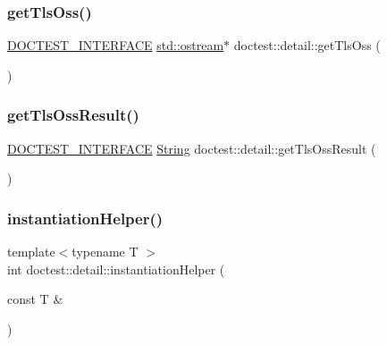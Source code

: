 \mbox{\label{namespacedoctest_1_1detail_a52299f4a981a01a3d3fe6e8d7518823d}} 
\subsubsection{\texorpdfstring{get\+Tls\+Oss()}{getTlsOss()}}
{\footnotesize\ttfamily \hyperlink{doctest_8h_a9c16ffc635ec47f07797d21ede26b1a5}{D\+O\+C\+T\+E\+S\+T\+\_\+\+I\+N\+T\+E\+R\+F\+A\+CE} \hyperlink{doctest_8h_a116af65cb5e924b33ad9d9ecd7a783f3}{std\+::ostream}$\ast$ doctest\+::detail\+::get\+Tls\+Oss (\begin{DoxyParamCaption}{ }\end{DoxyParamCaption})}

\mbox{\label{namespacedoctest_1_1detail_a7b0b3df5fe79d7ffa8fa138201476df1}} 
\subsubsection{\texorpdfstring{get\+Tls\+Oss\+Result()}{getTlsOssResult()}}
{\footnotesize\ttfamily \hyperlink{doctest_8h_a9c16ffc635ec47f07797d21ede26b1a5}{D\+O\+C\+T\+E\+S\+T\+\_\+\+I\+N\+T\+E\+R\+F\+A\+CE} \hyperlink{classdoctest_1_1_string}{String} doctest\+::detail\+::get\+Tls\+Oss\+Result (\begin{DoxyParamCaption}{ }\end{DoxyParamCaption})}

\mbox{\label{namespacedoctest_1_1detail_aad401b097a9af4df1d4a9d0911957c0f}} 
\subsubsection{\texorpdfstring{instantiation\+Helper()}{instantiationHelper()}}
{\footnotesize\ttfamily template$<$typename T $>$ \\
int doctest\+::detail\+::instantiation\+Helper (\begin{DoxyParamCaption}\item[{const T \&}]{ }\end{DoxyParamCaption})}

